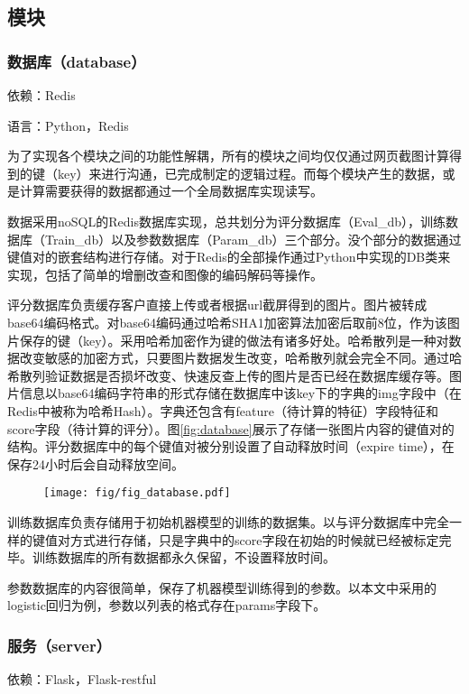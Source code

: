 \subsection{模块}
\subsubsection{数据库（database）}
依赖：Redis

语言：Python，Redis

为了实现各个模块之间的功能性解耦，所有的模块之间均仅仅通过网页截图计算得到的键（key）来进行沟通，已完成制定的逻辑过程。而每个模块产生的数据，或是计算需要获得的数据都通过一个全局数据库实现读写。

数据采用noSQL的Redis数据库实现，总共划分为评分数据库（Eval\_db），训练数据库（Train\_db）以及参数数据库（Param\_db）三个部分。没个部分的数据通过键值对的嵌套结构进行存储。对于Redis的全部操作通过Python中实现的DB类来实现，包括了简单的增删改查和图像的编码解码等操作。

评分数据库负责缓存客户直接上传或者根据url截屏得到的图片。图片被转成base64编码格式。对base64编码通过哈希SHA1加密算法加密后取前8位，作为该图片保存的键（key）。采用哈希加密作为键的做法有诸多好处。哈希散列是一种对数据改变敏感的加密方式，只要图片数据发生改变，哈希散列就会完全不同。通过哈希散列验证数据是否损坏改变、快速反查上传的图片是否已经在数据库缓存等。图片信息以base64编码字符串的形式存储在数据库中该key下的字典的img字段中（在Redis中被称为哈希Hash）。字典还包含有feature（待计算的特征）字段特征和score字段（待计算的评分）。图\ref{fig:database}展示了存储一张图片内容的键值对的结构。评分数据库中的每个键值对被分别设置了自动释放时间（expire time），在保存24小时后会自动释放空间。

\begin{figure}[H]
  \center
  \texttt{[image: fig/fig\_database.pdf]}
\end{figure}

训练数据库负责存储用于初始机器模型的训练的数据集。以与评分数据库中完全一样的键值对方式进行存储，只是字典中的score字段在初始的时候就已经被标定完毕。训练数据库的所有数据都永久保留，不设置释放时间。

参数数据库的内容很简单，保存了机器模型训练得到的参数。以本文中采用的logistic回归为例，参数以列表的格式存在params字段下。

\subsubsection{服务（server）}
依赖：Flask，Flask-restful

